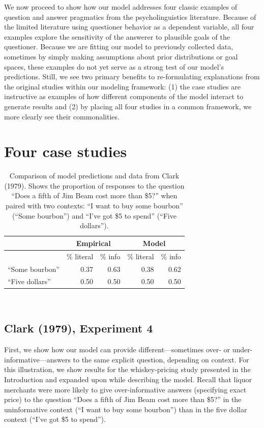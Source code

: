 \documentclass[12pt, floatsintext, jou]{apa6}
\begin{document}
We now proceed to show how our model addresses four classic examples of question and answer pragmatics from the psycholinguistics literature. Because of the limited literature using questioner behavior as a dependent variable, all four examples explore the sensitivity of the answerer to plausible goals of the questioner. Because we are fitting our model to previously collected data, sometimes by simply making assumptions about prior distributions or goal spaces, these examples do not yet serve as a strong test of our model's predictions. Still, we see two primary benefits to re-formulating explanations from the original studies within our modeling framework: (1) the case studies are instructive as examples of how different components of the model interact to generate results and (2) by placing all four studies in a common framework, we more clearly see their commonalities. 

\section{Four case studies}

\begin{table}[t]
\centering
\begin{tabular}{ p{3cm} | r | r ||||||  r | r }
& \multicolumn{2}{c||||||}{Empirical} & \multicolumn{2}{c}{Model} \\
\hline
&           \% literal &   \%  info &           \% literal &   \%  info    \\
\hline
``Some bourbon'' &   0.37 & 0.63 &  0.38 & 0.62 \\
\hline
``Five dollars''     & 0.50 & 0.50 & 0.50 & 0.50 \\
\end{tabular}
\\[1.5pt]
\caption{Comparison of model predictions and data from Clark (1979). Shows the proportion of responses to the question ``Does a fifth of Jim Beam cost more than \$5?'' when paired with two contexts: ``I want to buy some bourbon'' (``Some bourbon'') and ``I've got \$5 to spend'' (``Five dollars''). } 
\label{table:clark79exp4}
\end{table}

\subsection{Clark (1979), Experiment 4}
First, we show how our model can provide different---sometimes over- or under-informative---answers to the same explicit question, depending on context. For this illustration, we show results for the whiskey-pricing study presented in the Introduction \cite{Clark79_IndirectSpeechActs} and expanded upon while describing the model. Recall that liquor merchants were more likely to give over-informative answers (specifying exact price) to the question ``Does a fifth of Jim Beam cost more than \$5?'' in the uninformative context (``I want to buy some bourbon'') than in the five dollar context (``I've got \$5 to spend'').
\end{document}
